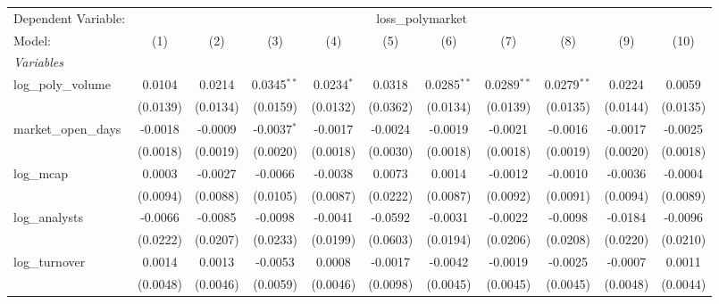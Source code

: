 \begingroup
\centering
\begin{tabular}{lcccccccccc}
   \tabularnewline \midrule \midrule
   Dependent Variable: & \multicolumn{10}{c}{loss\_polymarket}\\
   Model:                  & (1)      & (2)      & (3)           & (4)          & (5)      & (6)           & (7)           & (8)           & (9)            & (10)\\  
   \midrule
   \emph{Variables}\\
   log\_poly\_volume       & 0.0104   & 0.0214   & 0.0345$^{**}$ & 0.0234$^{*}$ & 0.0318   & 0.0285$^{**}$ & 0.0289$^{**}$ & 0.0279$^{**}$ & 0.0224         & 0.0059\\   
                           & (0.0139) & (0.0134) & (0.0159)      & (0.0132)     & (0.0362) & (0.0134)      & (0.0139)      & (0.0135)      & (0.0144)       & (0.0135)\\   
   market\_open\_days      & -0.0018  & -0.0009  & -0.0037$^{*}$ & -0.0017      & -0.0024  & -0.0019       & -0.0021       & -0.0016       & -0.0017        & -0.0025\\   
                           & (0.0018) & (0.0019) & (0.0020)      & (0.0018)     & (0.0030) & (0.0018)      & (0.0018)      & (0.0019)      & (0.0020)       & (0.0018)\\   
   log\_mcap               & 0.0003   & -0.0027  & -0.0066       & -0.0038      & 0.0073   & 0.0014        & -0.0012       & -0.0010       & -0.0036        & -0.0004\\   
                           & (0.0094) & (0.0088) & (0.0105)      & (0.0087)     & (0.0222) & (0.0087)      & (0.0092)      & (0.0091)      & (0.0094)       & (0.0089)\\   
   log\_analysts           & -0.0066  & -0.0085  & -0.0098       & -0.0041      & -0.0592  & -0.0031       & -0.0022       & -0.0098       & -0.0184        & -0.0096\\   
                           & (0.0222) & (0.0207) & (0.0233)      & (0.0199)     & (0.0603) & (0.0194)      & (0.0206)      & (0.0208)      & (0.0220)       & (0.0210)\\   
   log\_turnover           & 0.0014   & 0.0013   & -0.0053       & 0.0008       & -0.0017  & -0.0042       & -0.0019       & -0.0025       & -0.0007        & 0.0011\\   
                           & (0.0048) & (0.0046) & (0.0059)      & (0.0046)     & (0.0098) & (0.0045)      & (0.0045)      & (0.0045)      & (0.0048)       & (0.0044)\\   

\end{tabular}
